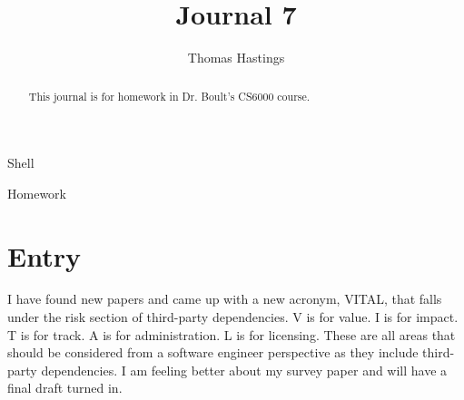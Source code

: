 \documentclass[journal]{IEEEtran}
\begin{document}
  \title{Journal 7}
  \author{Thomas Hastings}%
  
  {Shell}
  \maketitle
  
  \begin{abstract}
  This journal is for homework in Dr. Boult's CS6000 course.
  \end{abstract}
  
  \begin{IEEEkeywords}
  Homework
  \end{IEEEkeywords}
  
  
  \section{Entry}
  I have found new papers and came up with a new acronym, VITAL, that falls under the risk section of third-party dependencies. V is for value. I is for impact. T is for track. A is for administration. L is for licensing. These are all areas that should be considered from a software engineer perspective as they include third-party dependencies. I am feeling better about my survey paper and will have a final draft turned in. 

  
  
\end{document}
